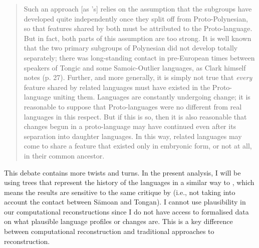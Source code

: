 \documentclass[12pt,letterpaper]{article}
\begin{document}
\begin{quotation}
\noindent Such an approach [as \citeauthor{clark1973aspects}'s] relies on the assumption that the subgroups have developed quite independently once they split off from Proto-Polynesian, so that features shared by both must be attributed to the Proto-language. But in fact, both parts of this assumption are too strong. It is well known that the two primary subgroups of Polynesian did not develop totally separately; there was long-standing contact in pre-European times between speakers of Tongic and some Samoic-Outlier languages, as Clark himself notes (p. 27). Further, and more generally, it is simply not true that \textit{every} feature shared by related languages must have existed in the Proto-language uniting them. Languages are constantly undergoing change; it is reasonable to suppose that Proto-languages were no different from real languages in this respect. But if this is so, then it is also reasonable that changes begun in a proto-language may have continued even after its separation into daughter languages. In this way, related languages may come to share a feature that existed only in embryonic form, or not at all, in their common ancestor.
\end{quotation}

This debate contains more twists and turns. In the present analysis, I will be using trees that represent the history of the languages in a similar way to \citet{clark1973aspects}, which means the results are sensitive to the same critique by \citet{chung1977aspects} (i.e., not taking into account the contact between S\={a}moan and Tongan). I cannot use plausibility in our computational reconstructions since I do not have access to formalised data on what plausible language profiles or changes are. This is a key difference between computational reconstruction and traditional approaches to reconstruction.

\end{document}
